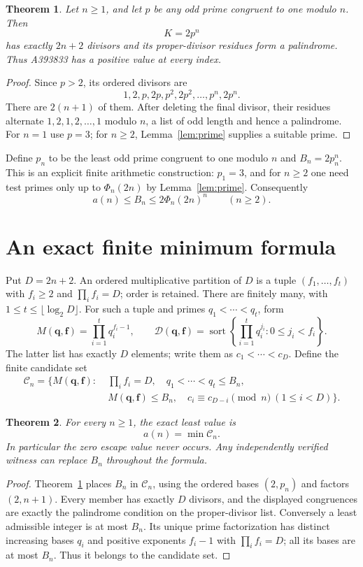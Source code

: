 \documentclass[10pt]{article}
\newtheorem{theorem}{Theorem}
\begin{document}
\begin{theorem}\label{thm:witness}
Let $n\ge1$, and let $p$ be any odd prime congruent to one modulo
$n$. Then
\[
 K=2p^n
\]
has exactly $2n+2$ divisors and its proper-divisor residues form a
palindrome. Thus A393833 has a positive value at every index.
\end{theorem}
\begin{proof}
Since $p>2$, its ordered divisors are
\[
 1,2,p,2p,p^2,2p^2,\ldots,p^n,2p^n.
\]
There are $2(n+1)$ of them. After deleting the final divisor,
their residues alternate $1,2,1,2,\ldots,1$ modulo $n$, a list
of odd length and hence a palindrome. For $n=1$ use $p=3$;
for $n\ge2$, Lemma~\ref{lem:prime} supplies a suitable prime.
\end{proof}

Define $p_n$ to be the least odd prime congruent to one modulo $n$
and $B_n=2p_n^n$. This is an explicit finite arithmetic construction:
$p_1=3$, and for $n\ge2$ one need test primes only up to
$\Phi_n(2n)$ by Lemma~\ref{lem:prime}. Consequently
\begin{equation}\label{eq:bound}
 a(n)\le B_n\le2\Phi_n(2n)^n\qquad(n\ge2).
\end{equation}

\section{An exact finite minimum formula}
Put $D=2n+2$. An ordered multiplicative partition of $D$ is a tuple
$(f_1,\ldots,f_t)$ with $f_i\ge2$ and $\prod_i f_i=D$;
order is retained. There are finitely many, with
$1\le t\le\lfloor\log_2 D\rfloor$. For such a tuple and primes
$q_1<\cdots<q_t$, form
\[
 M(\mathbf q,\mathbf f)=\prod_{i=1}^t q_i^{f_i-1},\qquad
 \mathcal D(\mathbf q,\mathbf f)=
 \operatorname{sort}\left\{\prod_{i=1}^t q_i^{j_i}:0\le j_i<f_i\right\}.
\]
The latter list has exactly $D$ elements; write them as
$c_1<\cdots<c_D$. Define the finite candidate set
\begin{align*}
 \mathcal C_n=\bigl\{M(\mathbf q,\mathbf f):\;&
 \prod_i f_i=D,\quad q_1<\cdots<q_t\le B_n,\\
 &M(\mathbf q,\mathbf f)\le B_n,\quad
 c_i\equiv c_{D-i}\pmod n\ (1\le i<D)\bigr\}.
\end{align*}
\begin{theorem}\label{thm:min}
For every $n\ge1$, the exact least value is
\[
 \boxed{a(n)=\min\mathcal C_n.}
\]
In particular the zero escape value never occurs. Any independently
verified witness can replace $B_n$ throughout the formula.
\end{theorem}
\begin{proof}
Theorem~\ref{thm:witness} places $B_n$ in $\mathcal C_n$, using
the ordered bases $(2,p_n)$ and factors $(2,n+1)$.
Every member has exactly $D$ divisors, and the displayed congruences
are exactly the palindrome condition on the proper-divisor list.
Conversely a least admissible integer is at most $B_n$.
Its unique prime factorization has distinct increasing bases $q_i$
and positive exponents $f_i-1$ with $\prod_i f_i=D$; all its bases
are at most $B_n$. Thus it belongs to the candidate set.
\end{proof}
\end{document}
